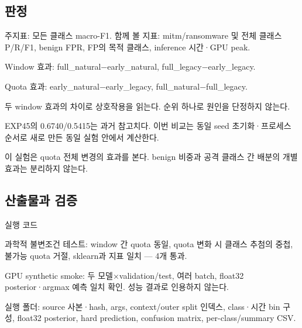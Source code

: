\subsection{판정}
\par\noindent \textbullet\enspace 주지표: 모든 클래스 macro-F1. 함께 볼 지표: mitm/\allowbreak{}ransomware 및 전체 클래스 P/\allowbreak{}R/\allowbreak{}F1, benign FPR, FP의 목적 클래스, inference 시간·GPU peak.


\par\noindent \textbullet\enspace Window 효과: full\_\allowbreak{}natural−early\_\allowbreak{}natural, full\_\allowbreak{}legacy−early\_\allowbreak{}legacy.


\par\noindent \textbullet\enspace Quota 효과: early\_\allowbreak{}natural−early\_\allowbreak{}legacy, full\_\allowbreak{}natural−full\_\allowbreak{}legacy.


\par\noindent \textbullet\enspace 두 window 효과의 차이로 상호작용을 읽는다. 순위 하나로 원인을 단정하지 않는다.


\par\noindent \textbullet\enspace EXP45의 0.6740/\allowbreak{}0.5415는 과거 참고치다. 이번 비교는 동일 seed 초기화·프로세스 순서로 새로 만든 동일 실험 안에서 계산한다.


\par\noindent \textbullet\enspace 이 실험은 quota 전체 변경의 효과를 본다. benign 비중과 공격 클래스 간 배분의 개별 효과는 분리하지 않는다.


\subsection{산출물과 검증}
\par\noindent \textbullet\enspace 실행 코드


\par\noindent \textbullet\enspace 과학적 불변조건 테스트: window 간 quota 동일, quota 변화 시 클래스 추첨의 중첩, 불가능 quota 거절, sklearn과 지표 일치 — 4개 통과.


\par\noindent \textbullet\enspace GPU synthetic smoke: 두 모델×validation/\allowbreak{}test, 여러 batch, float32 posterior·argmax 예측 일치 확인. 성능 결과로 인용하지 않는다.


\par\noindent \textbullet\enspace 실행 폴더: source 사본·hash, args, context/\allowbreak{}outer split 인덱스, class·시간 bin 구성, float32 posterior, hard prediction, confusion matrix, per-class/\allowbreak{}summary CSV.


